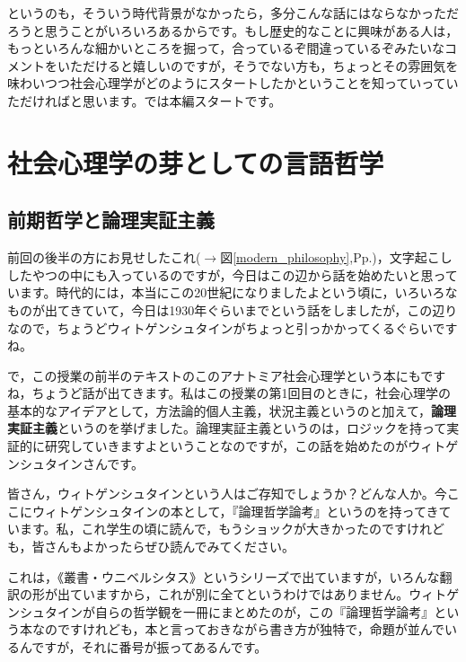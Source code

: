 \documentclass{ltjsbook}
\begin{document}
というのも，そういう時代背景がなかったら，多分こんな話にはならなかっただろうと思うことがいろいろあるからです。もし歴史的なことに興味がある人は，もっといろんな細かいところを掘って，合っているぞ間違っているぞみたいなコメントをいただけると嬉しいのですが，そうでない方も，ちょっとその雰囲気を味わいつつ社会心理学がどのようにスタートしたかということを知っていっていただければと思います。では本編スタートです。

\section{社会心理学の芽としての言語哲学}

\subsection{前期哲学と論理実証主義}
前回の後半の方にお見せしたこれ($\to$図\ref{modern_philosophy},Pp.\pageref{modern_philosophy})，文字起こししたやつの中にも入っているのですが，今日はこの辺から話を始めたいと思っています。時代的には，本当にこの20世紀になりましたよという頃に，いろいろなものが出てきていて，今日は1930年ぐらいまでという話をしましたが，この辺りなので，ちょうどウィトゲンシュタインがちょっと引っかかってくるぐらいですね。

で，この授業の前半のテキストのこのアナトミア社会心理学\parencite{anatomia}という本にもですね，ちょうど話が出てきます。私はこの授業の第1回目のときに，社会心理学の基本的なアイデアとして，方法論的個人主義，状況主義というのと加えて，\textbf{論理実証主義}というのを挙げました。論理実証主義というのは，ロジックを持って実証的に研究していきますよということなのですが，この話を始めたのがウィトゲンシュタインさんです。

皆さん，ウィトゲンシュタインという人はご存知でしょうか？どんな人か。今ここにウィトゲンシュタインの本として，『論理哲学論考』\parencite{Wittgenstein1}というのを持ってきています。私，これ学生の頃に読んで，もうショックが大きかったのですけれども，皆さんもよかったらぜひ読んでみてください。

これは，《叢書・ウニベルシタス》というシリーズで出ていますが，いろんな翻訳の形が出ていますから，これが別に全てというわけではありません。ウィトゲンシュタインが自らの哲学観を一冊にまとめたのが，この『論理哲学論考』という本なのですけれども，本と言っておきながら書き方が独特で，命題が並んでいるんですが，それに番号が振ってあるんです。
\end{document}
